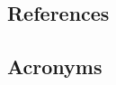 
\subsection{References\label{sect:references}}
\vspace*{-1cm}
\renewcommand{\refname}{}



\subsection{Acronyms}

